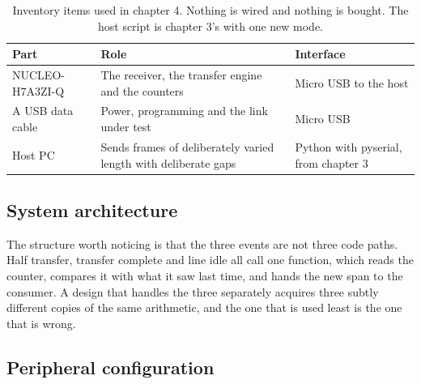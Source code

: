 \begin{table}[H]\centering\small
\begin{tabular}{p{40mm}p{66mm}p{40mm}}
\toprule
Part & Role & Interface \\
\midrule
NUCLEO-H7A3ZI-Q & The receiver, the transfer engine and the counters & Micro USB to the host \\
A USB data cable & Power, programming and the link under test & Micro USB \\
Host PC & Sends frames of deliberately varied length with deliberate gaps & Python with pyserial, from chapter 3 \\
\bottomrule
\end{tabular}
\caption{Inventory items used in chapter 4. Nothing is wired and nothing is bought. The host script is chapter 3's with one new mode.}
\end{table}

\subsection*{System architecture}


The structure worth noticing is that the three events are not three code paths.
Half transfer, transfer complete and line idle all call one function, which
reads the counter, compares it with what it saw last time, and hands the new
span to the consumer. A design that handles the three separately acquires three
subtly different copies of the same arithmetic, and the one that is used least
is the one that is wrong.

\subsection*{Peripheral configuration}

